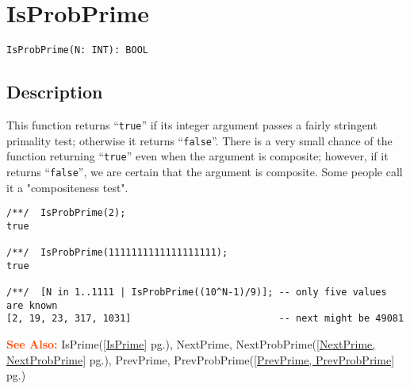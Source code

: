 \documentclass[a4paper]{mybook}
\newenvironment{command}{}{} %
\newcommand\SeeAlso{\par\textcolor{OrangeRed}{\textbf{\large See Also: }}}
\begin{document}
\section{IsProbPrime}
\label{IsProbPrime}
\begin{command} %


\begin{Verbatim}[label=syntax, rulecolor=\color{MidnightBlue},
frame=single]
IsProbPrime(N: INT): BOOL
\end{Verbatim}


\subsection*{Description}

This function returns ``\verb&true&'' if its integer argument passes a fairly
stringent primality test; otherwise it returns ``\verb&false&''.  There is a very
small chance of the function returning ``\verb&true&'' even when the argument is
composite; however, if it returns ``\verb&false&'', we are certain that the
argument is composite.  Some people call it a "compositeness test".
\begin{Verbatim}[label=example, rulecolor=\color{PineGreen}, frame=single]
/**/  IsProbPrime(2);
true

/**/  IsProbPrime(1111111111111111111);
true

/**/  [N in 1..1111 | IsProbPrime((10^N-1)/9)]; -- only five values are known
[2, 19, 23, 317, 1031]                          -- next might be 49081
\end{Verbatim}


\SeeAlso %
  IsPrime(\ref{IsPrime} pg.\pageref{IsPrime}), 
    NextPrime, NextProbPrime(\ref{NextPrime, NextProbPrime} pg.\pageref{NextPrime, NextProbPrime}), 
    PrevPrime, PrevProbPrime(\ref{PrevPrime, PrevProbPrime} pg.\pageref{PrevPrime, PrevProbPrime})
\end{command} %
\end{document}
